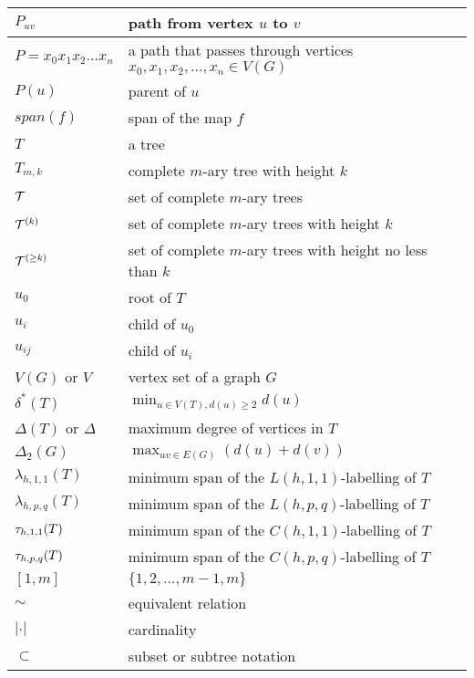 \begin{center}
\begin{longtable}{ | l |  p{8cm} |}
$P_{uv}$ & path from vertex $u$ to $v$ \\ \hline
$P=x_0x_1x_2 \dots x_n$ & a path that passes through vertices $x_0,x_1,x_2,\dots,x_n \in V(G)$ \\ \hline
$P(u)$ & parent of $u$ \\ \hline
$span(f)$ & span of the map $f$ \\ \hline
$T$ & a tree \\ \hline
$T_{m,k}$ & complete $m$-ary tree with height $k$ \\ \hline
${\cal T}$ & set of complete $m$-ary trees \\ \hline
${\cal T}^{(k)}$ & set of complete $m$-ary trees with height $k$ \\ \hline
${\cal T}^{(\ge k)}$ & set of complete $m$-ary trees with height no less than $k$ \\ \hline
$u_0$ & root of $T$ \\ \hline
$u_i$ & child of $u_0$ \\ \hline
$u_{ij}$ & child of $u_i$ \\ \hline
$V(G)$ or $V$ & vertex set of a graph $G$ \\ \hline
$\delta^*(T)$ & $\min_{u \in V(T), d(u) \ge 2} d(u)$ \\ \hline
$\Delta(T)$ or $\Delta$ & maximum degree of vertices in $T$ \\ \hline 
$\Delta_2(G)$ & $\max_{uv \in E(G)} (d(u) + d(v))$ \\ \hline
$\lambda_{h,1,1}(T)$ & minimum span of the $L(h,1,1)$-labelling of $T$ \\ \hline   
$\lambda_{h,p,q}(T)$ & minimum span of the $L(h,p,q)$-labelling of $T$ \\ \hline   
$\tau_{h,1,1}(T)$ & minimum span of the $C(h,1,1)$-labelling of $T$ \\ \hline
$\tau_{h,p,q}(T)$ & minimum span of the $C(h,p,q)$-labelling of $T$ \\ \hline
$[1,m]$ & $\{1, 2, \dots, m-1,m\}$ \\ \hline 
$\sim$ & equivalent relation \\ \hline
$|\cdot|$ & cardinality \\ \hline
$\subset$ & subset or subtree notation \\ \hline
     \end{longtable}
\end{center}
 
 
 
 
 
 
                                                          

